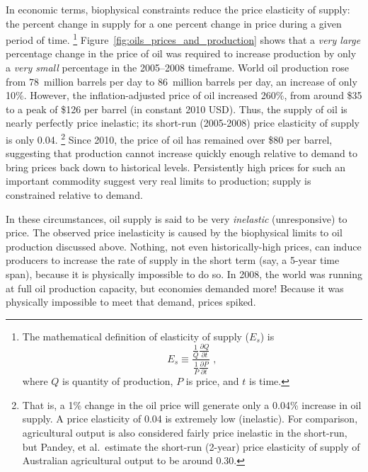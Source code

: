 In economic terms, biophysical constraints reduce the 
price elasticity of supply: 
the percent change in supply for a one percent change in price
during a given period of time.%
	\footnote{
	The mathematical definition of elasticity of supply ($E_s$) is
	\begin{equation*}
		E_s \equiv \frac{\frac{1}{Q}\frac{\partial Q}{\partial t}}
					{\frac{1}{P}\frac{\partial P}{\partial t}} \; ,
	\end{equation*}
	where $Q$ is quantity of production, $P$ is price, and $t$ is time.
	}
Figure~\ref{fig:oils_prices_and_production} shows that 
a \emph{very large} percentage change in the price of oil was required to 
increase production by only a \emph{very small} percentage
in the 2005--2008 timeframe.
World oil production rose from 
78~million barrels per day to 86~million barrels per day,
an increase of only 10\%.\cite{EIA2014}
However, the inflation-adjusted price of oil increased 260\%,
from around \$35 to a peak of \$126 per barrel 
(in constant 2010 USD).
Thus, the supply of oil is nearly perfectly price inelastic;
its short-run (2005-2008) price elasticity of supply is only 0.04.%
	\footnote{
	That is, a 1\% change in the oil price will generate
	only a 0.04\% increase in oil supply. 
	A price elasticity of 0.04 is extremely low (inelastic). 
	For comparison, agricultural output is also considered fairly price inelastic 
	in the short-run, but
	Pandey, et al.\ estimate the short-run (2-year) 
	price elasticity of supply of Australian agricultural output 
	to be around 0.30.\cite[p.~215]{pandey1982}
	}
Since 2010, the price of oil has remained over \$80 per barrel,
suggesting that production cannot increase quickly enough relative to demand
to bring prices back down to historical levels.
Persistently high prices for such an important commodity
suggest very real limits to production; 
supply is constrained relative to demand. 

In these circumstances, 
oil supply is said to be very \emph{inelastic} (unresponsive) to price.
The observed price inelasticity is caused by 
the biophysical limits to oil production discussed above.
Nothing, not even historically-high prices, can induce producers to 
increase the rate of supply in the short term (say, a 5-year time span), 
because it is physically impossible to do so.
In 2008, the world was running at full oil production capacity, 
but economies demanded more!
Because it was physically impossible to meet that demand,
prices spiked.


